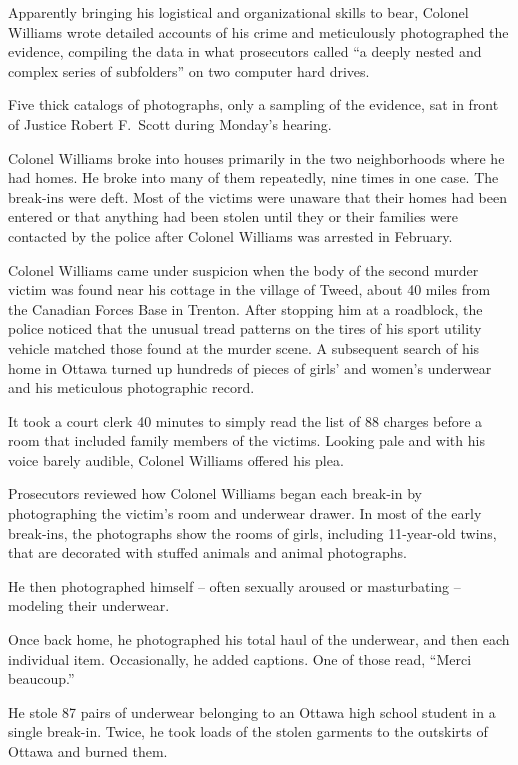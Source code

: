 ﻿\documentclass[12pt]{article}
\begin{document}
Apparently bringing his logistical and organizational skills to bear, Colonel Williams wrote
detailed accounts of his crime and meticulously photographed the evidence, compiling the data in
what prosecutors called ``a deeply nested and complex series of subfolders'' on two computer hard
drives.

Five thick catalogs of photographs, only a sampling of the evidence, sat in front of Justice Robert
F.~Scott during Monday's hearing.

Colonel Williams broke into houses primarily in the two neighborhoods where he had homes. He broke
into many of them repeatedly, nine times in one case. The break-ins were deft. Most of the victims
were unaware that their homes had been entered or that anything had been stolen until they or their
families were contacted by the police after Colonel Williams was arrested in February.

Colonel Williams came under suspicion when the body of the second murder victim was found near his
cottage in the village of Tweed, about 40 miles from the Canadian Forces Base in Trenton. After
stopping him at a roadblock, the police noticed that the unusual tread patterns on the tires of his
sport utility vehicle matched those found at the murder scene. A subsequent search of his home in
Ottawa turned up hundreds of pieces of girls' and women's underwear and his meticulous photographic
record.

It took a court clerk 40 minutes to simply read the list of 88 charges before a room that included
family members of the victims. Looking pale and with his voice barely audible, Colonel Williams
offered his plea.

Prosecutors reviewed how Colonel Williams began each break-in by photographing the victim's room and
underwear drawer. In most of the early break-ins, the photographs show the rooms of girls, including
11-year-old twins, that are decorated with stuffed animals and animal photographs.

He then photographed himself -- often sexually aroused or masturbating -- modeling their underwear.

Once back home, he photographed his total haul of the underwear, and then each individual item.
Occasionally, he added captions. One of those read, ``Merci beaucoup.''

He stole 87 pairs of underwear belonging to an Ottawa high school student in a single break-in.
Twice, he took loads of the stolen garments to the outskirts of Ottawa and burned them.
\end{document}
